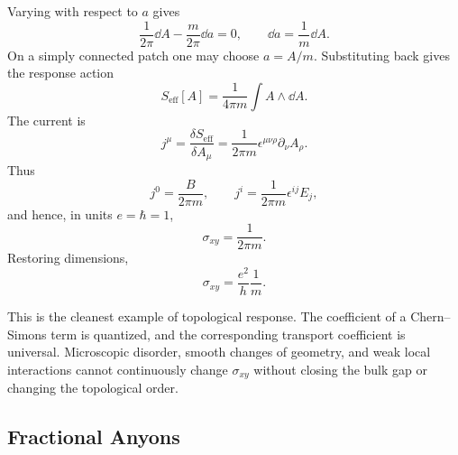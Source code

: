 Varying with respect to $a$ gives
\begin{equation}
  \frac{1}{2\pi}\dd A-\frac{m}{2\pi}\dd a=0,
  \qquad
  \dd a=\frac{1}{m}\dd A.
  \label{eq:anomaly-integrate-a-eom}
\end{equation}
On a simply connected patch one may choose $a=A/m$. Substituting back gives the response action
\begin{equation}
  S_{\mathrm{eff}}[A]
  =
  \frac{1}{4\pi m}\int A\wedge\dd A.
  \label{eq:anomaly-effective-A}
\end{equation}
The current is
\begin{equation}
  j^\mu
  =
  \frac{\delta S_{\mathrm{eff}}}{\delta A_\mu}
  =
  \frac{1}{2\pi m}\epsilon^{\mu\nu\rho}\partial_\nu A_\rho.
  \label{eq:anomaly-current-response}
\end{equation}
Thus
\begin{equation}
  j^0=\frac{B}{2\pi m},
  \qquad
  j^i=\frac{1}{2\pi m}\epsilon^{ij}E_j,
  \label{eq:anomaly-density-hall-current}
\end{equation}
and hence, in units $e=\hbar=1$,
\begin{equation}
  \sigma_{xy}=\frac{1}{2\pi m}.
  \label{eq:anomaly-hall-conductance-natural}
\end{equation}
Restoring dimensions,
\begin{equation}
  \sigma_{xy}=\frac{e^2}{h}\frac{1}{m}.
  \label{eq:anomaly-hall-conductance-physical}
\end{equation}

This is the cleanest example of topological response. The coefficient of a Chern--Simons term is quantized, and the corresponding transport coefficient is universal. Microscopic disorder, smooth changes of geometry, and weak local interactions cannot continuously change $\sigma_{xy}$ without closing the bulk gap or changing the topological order.


\subsection{Fractional Anyons}
\label{subsec:fractional-charge-statistics}

